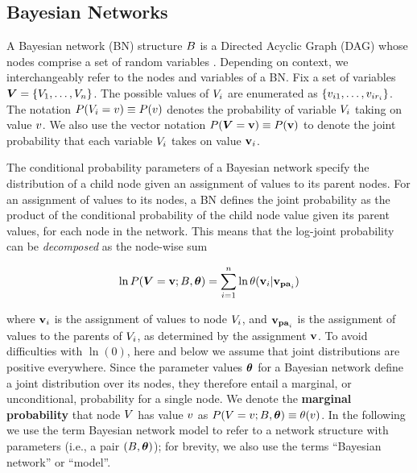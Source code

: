 {{\subsection{Bayesian Networks}

A Bayesian network (BN) structure $B$ is a Directed Acyclic Graph (DAG)  whose nodes comprise a set of random variables \citep{Pearl1988}. Depending on context, we interchangeably refer to the nodes  and variables of a BN. Fix a set of variables $\boldsymbol{V} = \{V_{1},\ldots,V_{n}\}$. 
The possible values of $V_{i}$ are enumerated as $\{v_{i1},\ldots,v_{ir_{i}}\}$. The notation $P(V_{i} = v)\equiv P(v)$ denotes the probability of variable $V_{i}$ taking on value $v$. We also use the vector notation $P(\boldsymbol{V} = \mathbf{v}) \equiv P(\mathbf{v})$ to denote the joint probability that each variable $V_{i}$ takes on value $\mathbf{v}_{i}$. 


The conditional probability parameters of a Bayesian network specify the distribution of a child node given an assignment of values to its parent nodes. For an assignment of values to its nodes, a BN defines the joint probability as the product of the conditional probability of the child node value given its parent values, for each node in the network. This means that the log-joint probability can be {\em decomposed} as the node-wise sum

\begin{equation} \label{eq:bn}
\ln P(\boldsymbol{V} = \mathbf{v};B,\boldsymbol{\theta}) = \sum_{i=1}^{n} \ln \theta(\mathbf{v}_{i}|\mathbf{v}_{\mathbf{pa}_{i}})
\end{equation}

\noindent where $\mathbf{v}_{i}$ is the assignment of values to node $V_{i}$, and $\mathbf{v}_{\mathbf{pa}_{i}}$  is the assignment of values to the parents of $V_{i}$, as determined by the assignment $\mathbf{v}$. 
To avoid difficulties with $\ln(0)$, here and below we assume that joint distributions are positive everywhere. Since the parameter values $\boldsymbol{\theta}$ for a Bayesian network define a joint distribution over its nodes, they therefore entail a marginal, or unconditional, probability for a single node. We denote the \textbf{marginal probability} that node $V$ has value $v$ as $P(V = v;B,\boldsymbol{\theta}) \equiv \theta(v)$. In the following we use the term Bayesian network model to refer to a network structure with parameters (i.e., a pair $(B,\boldsymbol{\theta})$); for brevity, we also use the terms ``Bayesian network'' or ``model''. 

}}
